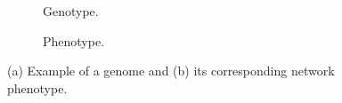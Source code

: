 \begin{figure}[htb]
    \begin{mdframed}
        \begin{subfigure}[b]{0.45\textwidth}
            \centering
            \resizebox{1\textwidth}{!}{}
            \caption{Genotype.}
            \label{genotype}
        \end{subfigure}
        \begin{subfigure}[b]{0.45\textwidth}
            \centering
            \resizebox{0.65\textwidth}{!}{}
            \caption{Phenotype.}
            \label{phenotype}
        \end{subfigure}
    \end{mdframed}
    \caption{ (a) Example of a genome and (b) its corresponding network phenotype.}
    \label{mapping}
\end{figure}
